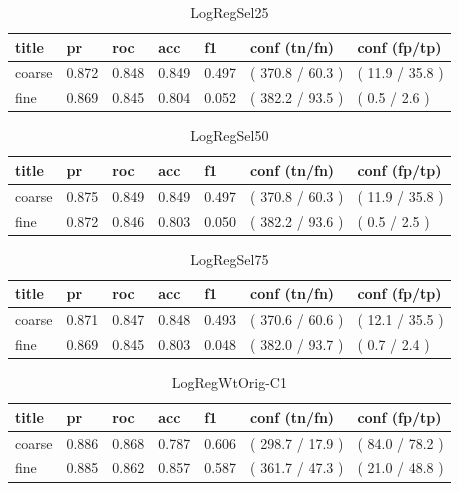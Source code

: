 \documentclass[ms]{nuthesis}
\begin{document}
\FloatBarrier
\begin{table}[h]
\centering
\begin{tabular}{|l||l||l||l||l||l||l|}\toprule
title & pr & roc & acc & f1 & conf (tn/fn) & conf (fp/tp) \\ \midrule
coarse & 0.872 & 0.848 & 0.849 & 0.497 & ( 370.8 / 60.3 ) & ( 11.9 / 35.8 ) \\
fine & 0.869 & 0.845 & 0.804 & 0.052 & ( 382.2 / 93.5 ) & ( 0.5 / 2.6 ) \\ \bottomrule
\end{tabular}
\caption{LogRegSel25}
\label{tab:LogRegSel25}
\end{table}
\FloatBarrier


\FloatBarrier
\begin{table}[h]
\centering
\begin{tabular}{|l||l||l||l||l||l||l|}\toprule
title & pr & roc & acc & f1 & conf (tn/fn) & conf (fp/tp) \\ \midrule
coarse & 0.875 & 0.849 & 0.849 & 0.497 & ( 370.8 / 60.3 ) & ( 11.9 / 35.8 ) \\
fine & 0.872 & 0.846 & 0.803 & 0.050 & ( 382.2 / 93.6 ) & ( 0.5 / 2.5 ) \\ \bottomrule
\end{tabular}
\caption{LogRegSel50}
\label{tab:LogRegSel50}
\end{table}
\FloatBarrier

\FloatBarrier
\begin{table}[h]
\centering
\begin{tabular}{|l||l||l||l||l||l||l|}\toprule
title & pr & roc & acc & f1 & conf (tn/fn) & conf (fp/tp) \\ \midrule
coarse & 0.871 & 0.847 & 0.848 & 0.493 & ( 370.6 / 60.6 ) & ( 12.1 / 35.5 ) \\
fine & 0.869 & 0.845 & 0.803 & 0.048 & ( 382.0 / 93.7 ) & ( 0.7 / 2.4 ) \\ \bottomrule
\end{tabular}
\caption{LogRegSel75}
\label{tab:LogRegSel75}
\end{table}
\FloatBarrier


\FloatBarrier
\begin{table}[h]
\centering
\begin{tabular}{|l||l||l||l||l||l||l|}\toprule
title & pr & roc & acc & f1 & conf (tn/fn) & conf (fp/tp) \\ \midrule
coarse & 0.886 & 0.868 & 0.787 & 0.606 & ( 298.7 / 17.9 ) & ( 84.0 / 78.2 ) \\
fine & 0.885 & 0.862 & 0.857 & 0.587 & ( 361.7 / 47.3 ) & ( 21.0 / 48.8 ) \\ \bottomrule
\end{tabular}
\caption{LogRegWtOrig-C1}
\label{tab:LogRegWtOrig-C1}
\end{table}
\FloatBarrier
\end{document}
